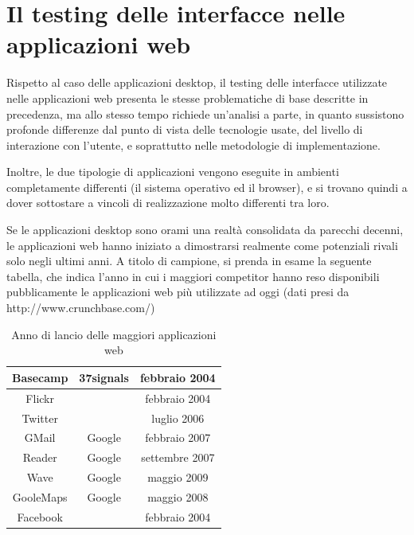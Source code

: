 \documentclass[12pt]{toptesi}
\begin{document}
\section{Il testing delle interfacce nelle applicazioni web}

Rispetto al caso delle applicazioni desktop, il testing delle interfacce utilizzate nelle applicazioni web presenta le stesse problematiche di base descritte in precedenza, ma allo stesso tempo richiede un'analisi a parte, in quanto sussistono profonde differenze dal punto di vista delle tecnologie usate, del livello di interazione con l'utente, e soprattutto nelle metodologie di implementazione.

Inoltre, le due tipologie di applicazioni vengono eseguite in ambienti completamente differenti (il sistema operativo ed il browser), e si trovano quindi a dover sottostare a vincoli di realizzazione molto differenti tra loro.

Se le applicazioni desktop sono orami una realtà consolidata da parecchi decenni, le applicazioni web hanno iniziato a dimostrarsi realmente come potenziali rivali solo negli ultimi anni. A titolo di campione, si prenda in esame la seguente tabella, che indica l'anno in cui i maggiori competitor hanno reso disponibili pubblicamente le applicazioni web più utilizzate ad oggi (dati presi da http://www.crunchbase.com/) %

\begin{table}[htdp]
\caption{Anno di lancio delle maggiori applicazioni web}
\begin{center}
\begin{tabular}{|c|c|c|}
\hline
Basecamp & 37signals & febbraio 2004\\\hline
Flickr & & febbraio 2004\\\hline
Twitter & & luglio 2006\\\hline
GMail & Google & febbraio 2007\\\hline
Reader & Google & settembre 2007\\\hline
Wave & Google & maggio 2009\\\hline
GooleMaps & Google & maggio 2008\\\hline
Facebook & & febbraio 2004\\\hline
\end{tabular}
\end{center}
\label{default}
\end{table}%

\end{document}
